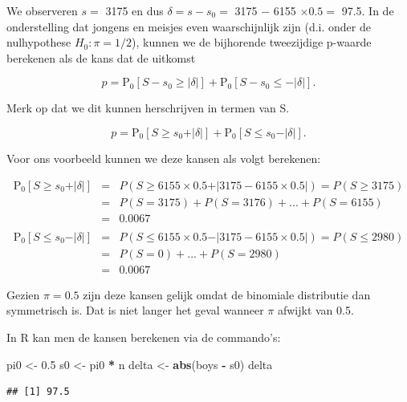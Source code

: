 \documentclass[
  12pt,dutch]{book}
\newenvironment{Shaded}{\begin{snugshade}}{\end{snugshade}}
\newcommand{\FloatTok}[1]{\textcolor[rgb]{0.00,0.00,0.81}{#1}}
\newcommand{\FunctionTok}[1]{\textcolor[rgb]{0.13,0.29,0.53}{\textbf{#1}}}
\newcommand{\NormalTok}[1]{#1}
\newcommand{\OtherTok}[1]{\textcolor[rgb]{0.56,0.35,0.01}{#1}}
\newcommand{\SpecialCharTok}[1]{\textcolor[rgb]{0.81,0.36,0.00}{\textbf{#1}}}
\theoremstyle{definition}
\theoremstyle{definition}
\theoremstyle{definition}
\theoremstyle{definition}
\theoremstyle{remark}
\begin{document}
We observeren \(s=\) 3175 en dus \(\delta=s-s_0=\) 3175 \(-\) 6155 \(\times 0.5=\) 97.5.
In de onderstelling dat jongens en meisjes even waarschijnlijk zijn (d.i. onder de nulhypothese \(H_0:\pi=1/2\)), kunnen we de bijhorende tweezijdige p-waarde berekenen als de kans dat de uitkomst

\[p=\text{P}_0\left[S-s_0\geq \vert \delta\vert \right] + \text{P}_0\left[S-s_0\leq - \vert \delta\vert \right].\]

Merk op dat we dit kunnen herschrijven in termen van S.

\[p=\text{P}_0\left[S\geq s_0+ \vert \delta\vert \right] + \text{P}_0\left[S \leq s_0 - \vert \delta\vert \right].\]

Voor ons voorbeeld kunnen we deze kansen als volgt berekenen:

\begin{eqnarray*}
\text{P}_0\left[S\geq s_0+ \vert \delta\vert \right] &=& P(S \geq 6155 \times 0.5 + \vert 3175 - 6155 \times 0.5\vert ) = P(S \geq 3175)\\
&= &P(S= 3175) + P(S=3176) + ... + P(S=6155)\\
& =& 0.0067\\\\
\text{P}_0\left[S \leq s_0 - \vert \delta\vert \right] &=& P(S \leq  6155 \times 0.5 - \vert 3175- 6155 \times 0.5\vert) = P(S \leq 2980)\\ &= &P(S=0) + ... + P(S=2980) \\
&=&0.0067
\end{eqnarray*}

Gezien \(\pi=0.5\) zijn deze kansen gelijk omdat de binomiale distributie dan symmetrisch is. Dat is niet langer het geval wanneer \(\pi\) afwijkt van 0.5.

In R kan men de kansen berekenen via de commando's:

\begin{Shaded}
\begin{Highlighting}[]
\NormalTok{pi0 }\OtherTok{\textless{}{-}} \FloatTok{0.5}
\NormalTok{s0 }\OtherTok{\textless{}{-}}\NormalTok{ pi0 }\SpecialCharTok{*}\NormalTok{ n}
\NormalTok{delta }\OtherTok{\textless{}{-}} \FunctionTok{abs}\NormalTok{(boys }\SpecialCharTok{{-}}\NormalTok{ s0)}
\NormalTok{delta}
\end{Highlighting}
\end{Shaded}

\begin{verbatim}
## [1] 97.5
\end{verbatim}
\end{document}
